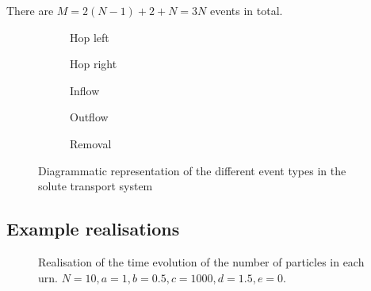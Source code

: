 \documentclass[a4paper,11pt]{report}
\numberwithin{equation}{section}
\begin{document}
There are \(M=2(N-1) + 2 + N = 3N\) events in total.

\begin{figure}[ht!]
    \centering
    \begin{subfigure}[b]{0.3\textwidth}
        \centering
        {
        }
        \caption{Hop left}
    \end{subfigure}
    \qquad\qquad
    \begin{subfigure}[b]{0.3\textwidth}
        \centering
        {
        }
        \caption{Hop right}
    \end{subfigure}

    \begin{subfigure}[b]{0.3\textwidth}
        \centering
        {
        }
        \caption{Inflow}
    \end{subfigure}
    \qquad\qquad
    \begin{subfigure}[b]{0.3\textwidth}
        \centering
        {
        }
        \caption{Outflow}
    \end{subfigure}

    \begin{subfigure}[b]{0.3\textwidth}
        \centering
        {
        }
        \caption{Removal}
    \end{subfigure}
    \caption{\label{fig:transport_events}Diagrammatic representation of the
different event types in the solute transport system}
\end{figure}

\FloatBarrier

\subsection{Example realisations}

\begin{figure}[ht!]
    \centering
    {
    }

    \caption{\label{fig:exreal1}Realisation of the time evolution of the number
of particles in each urn. \(N=10,a=1,b=0.5,c=1000,d=1.5,e=0\).}
\end{figure}
\end{document}

